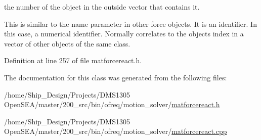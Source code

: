 the number of the object in the outside vector that contains it. 

This is similar to the name parameter in other force objects. It is an identifier. In this case, a numerical identifier. Normally correlates to the objects index in a vector of other objects of the same class. 

Definition at line 257 of file matforcereact.\-h.



The documentation for this class was generated from the following files\-:\begin{DoxyCompactItemize}
\item 
/home/\-Ship\-\_\-\-Design/\-Projects/\-D\-M\-S1305 Open\-S\-E\-A/master/200\-\_\-src/bin/ofreq/motion\-\_\-solver/\hyperlink{matforcereact_8h}{matforcereact.\-h}\item 
/home/\-Ship\-\_\-\-Design/\-Projects/\-D\-M\-S1305 Open\-S\-E\-A/master/200\-\_\-src/bin/ofreq/motion\-\_\-solver/\hyperlink{matforcereact_8cpp}{matforcereact.\-cpp}\end{DoxyCompactItemize}
